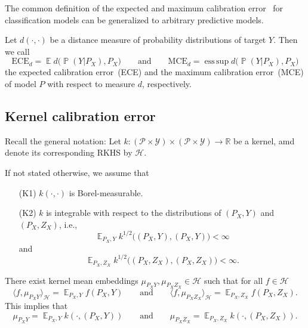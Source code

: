\documentclass{article}
\DeclareMathOperator{\Prob}{\mathbb{P}}
\DeclareMathOperator{\Exp}{\mathbb{E}}
\DeclareMathOperator*{\esssup}{ess\,sup}
\begin{document}
The common definition of the expected and maximum calibration error~\citep{Naeini2015,Guo2017,Vaicenavicius2019,Kull2019}
for classification models can be generalized to arbitrary predictive
models.

\begin{definition}\label{def:ece_mce}
Let $d(\cdot, \cdot)$ be a distance measure of probability distributions
of target $Y$. Then we call
\begin{equation*}
    \mathrm{ECE}_d = \Exp d\big(\Prob(Y|P_X), P_X\big) \qquad \text{and} \qquad
    \mathrm{MCE}_d = \esssup d\big(\Prob(Y|P_X), P_X\big)
\end{equation*} 
the expected calibration error~(ECE) and the maximum calibration error~(MCE)
of model $P$ with respect to measure $d$, respectively.
\end{definition}

\subsection{Kernel calibration error}

Recall the general notation: Let
$k \colon (\mathcal{P} \times \mathcal{Y}) \times (\mathcal{P} \times \mathcal{Y}) \to \mathbb{R}$
be a kernel, amd denote its corresponding RKHS by $\mathcal{H}$.

If not stated otherwise, we assume that
\begin{itemize}
    \item[(K1)] $k(\cdot, \cdot)$ is Borel-measurable.
    \item[(K2)] $k$ is integrable with respect to the distributions
    of $(P_X,Y)$ and $(P_X,Z_X)$, i.e.,
    \begin{equation*}
    \Exp_{P_X,Y} k^{1/2}\big((P_X, Y), (P_X, Y)\big) < \infty
    \end{equation*}
    and
    \begin{equation*}
    \Exp_{P_X,Z_X} k^{1/2}\big((P_X, Z_X), (P_X, Z_X)\big) < \infty.
    \end{equation*}
\end{itemize}

\begin{lemma}\label{lemma:mean_embedding}
There exist kernel mean embeddings
$\mu_{P_X Y}, \mu_{P_X Z_X} \in \mathcal{H}$
such that for all $f \in \mathcal{H}$
\begin{equation*}
    \langle f, \mu_{P_X Y} \rangle_{\mathcal{H}} = \Exp_{P_X,Y} f(P_X, Y) \qquad \text{and} \qquad    
    \langle f, \mu_{P_X Z_X} \rangle_{\mathcal{H}} = \Exp_{P_X,Z_X} f(P_X, Z_X).
\end{equation*}
This implies that
\begin{equation*}
    \mu_{P_X Y} = \Exp_{P_X,Y} k(\cdot, (P_X, Y)) \qquad \text{and} \qquad
    \mu_{P_X Z_X} = \Exp_{P_X,Z_X} k(\cdot, (P_X, Z_X)).
\end{equation*}
\end{lemma}
\end{document}
